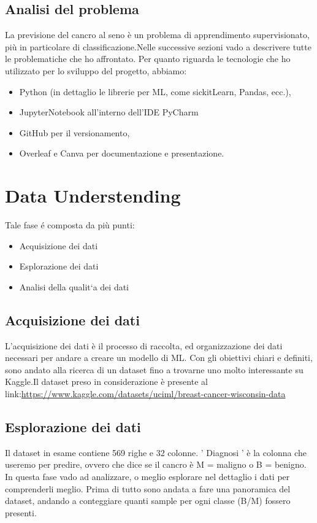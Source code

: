 \documentclass{article}
\begin{document}
\subsection{Analisi del problema}
La previsione del cancro al seno è un problema di apprendimento supervisionato, più in particolare di classificazione.Nelle successive sezioni vado a descrivere tutte le problematiche che ho affrontato.
Per quanto riguarda le tecnologie che ho utilizzato per lo sviluppo del progetto, abbiamo:
\begin{itemize}
    \item Python (in dettaglio le librerie per ML, come sickitLearn, Pandas, ecc.),
    \item JupyterNotebook all’interno dell’IDE PyCharm
    \item GitHub per il versionamento,
    \item Overleaf e Canva per documentazione e presentazione.
\end{itemize}

\newpage
\section{Data Understending}
Tale fase é composta da più punti:
\begin{itemize}
    \item Acquisizione dei dati
    \item Esplorazione dei dati
    \item Analisi della qualit`a dei dati
\end{itemize}

\subsection{Acquisizione dei dati}
L’acquisizione dei dati è il processo di raccolta, ed organizzazione dei dati necessari per andare a creare un modello di ML. Con gli obiettivi chiari e definiti, sono andato alla ricerca di un dataset fino a trovarne uno molto interessante su Kaggle.Il dataset preso in considerazione è presente al link:\url{https://www.kaggle.com/datasets/uciml/breast-cancer-wisconsin-data}


\subsection{Esplorazione dei dati}
Il dataset in esame contiene 569 righe e 32 colonne. ' Diagnosi ' è la colonna che useremo per predire, ovvero che dice se il cancro è M = maligno o B = benigno.  In questa fase vado ad analizzare, o meglio esplorare nel dettaglio i dati per comprenderli meglio.
Prima di tutto sono andata a fare una panoramica del dataset, andando a conteggiare quanti sample per ogni classe (B/M) fossero presenti.
\end{document}
